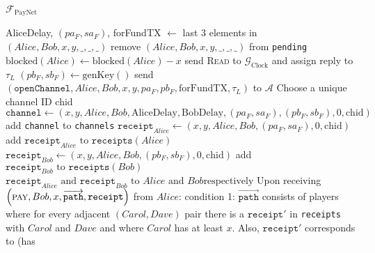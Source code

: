 \begin{functionality}{$\mathcal{F}_{\mathrm{PayNet}}$}
\begin{algorithmic}[1]
        \State AliceDelay, $\left(pa_F, sa_F\right)$, forFundTX $\gets$ last 3
        elements in $\left(Alice, Bob, x, y, \_, \_, \_\right)$
        \State remove $\left(Alice, Bob, x, y, \_, \_, \_\right)$ from
        \texttt{pending}
        \State $\mathrm{blocked}\left(Alice\right) \gets
        \mathrm{blocked}\left(Alice\right) - x$
        \State send \textsc{Read} to $\mathcal{G}_{\mathrm{Clock}}$ and assign
        reply to $\tau_L$
        \State $\left(pb_F, sb_F\right) \gets \mathrm{genKey}\left(\right)$
        \State send $\left(\mathtt{openChannel}, Alice, Bob, x, y, pa_F, pb_F,
        \mathrm{forFundTX}, \tau_L\right)$ to $\mathcal{A}$ 
        \State Choose a unique channel ID chid
        \State $\mathtt{channel} \gets \left(x, y, Alice, Bob,
        \mathrm{AliceDelay}, \mathrm{BobDelay}, \left(pa_F, sa_F\right),
        \left(pb_F, sb_F\right), 0, \mathrm{chid}\right)$
        \State add \texttt{channel} to \texttt{channels}
        \State $\mathtt{receipt}_{Alice} \gets \left(x, y, Alice, Bob,
        \left(pa_F, sa_F\right), 0, \mathrm{chid}\right)$
        \State add $\mathtt{receipt}_{Alice} \text{ to }
        \mathtt{receipts}\left(Alice\right)$
        \State $\mathtt{receipt}_{Bob} \gets \left(x, y, Alice, Bob,
        \left(pb_F, sb_F\right), 0, \mathrm{chid}\right)$
        \State add $\mathtt{receipt}_{Bob} \text{ to }
        \mathtt{receipts}\left(Bob\right)$
        \State \Return $\mathtt{receipt}_{Alice} \text{ and }
        \mathtt{receipt}_{Bob} \text{ to } Alice \text{ and } Bob \text{
        respectively}$
      \EndIf
    \EndIndent
    \State {}
    \State {}
    \State Upon receiving $\left(\textsc{pay}, Bob, x,
    \overrightarrow{\mathtt{path}}, \mathtt{receipt}\right)$ from $Alice$:
    \Indent
      \State condition 1: $\overrightarrow{\mathtt{path}}$ consists of players
      where for every adjacent $\left(Carol, Dave\right)$ pair there is a
      $\mathtt{receipt}'$ in \texttt{receipts} with $Carol$ and $Dave$ and where
      $Carol$ has at least $x$. Also, $\mathtt{receipt}'$ corresponds to (has

\end{algorithmic}
\end{functionality}
